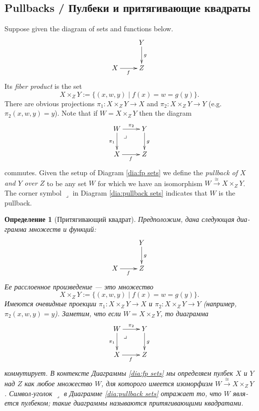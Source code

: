 \documentclass[a4paper]{book}
\makeatletter
\def\to{\rightarrow}
\def\taking{\colon}
\def\iso{\cong}
\def\|{{\;|\;}}
\def\ullimit{\ar@{}[rd]|(.3)*+{\lrcorner}}
\newcommand{\To}[1]{\xrightarrow{#1}}
\theoremstyle{myth}
\newtheorem{definitionENG}[envENG]{\begin{english}Definition\end{english}}
\newtheorem{definitionRUS}[envRUS]{Определение}
\makeatother
\begin{document}
\begin{russian}
\subsection{Pullbacks / Пулбеки и притягивающие квадраты}

\begin{definitionENG}[Pullback]\label{def:pullback}
Suppose given the diagram of sets and functions below.
\begin{align}\label{dia:fp sets}
\xymatrix{&Y\ar[d]^g\\
X\ar[r]_f&Z}
\end{align}
Its {\em fiber product} is the set 
$$X\times_ZY:=\{(x,w,y)\|f(x)=w=g(y)\}.$$ There are obvious projections $\pi_1\taking X\times_ZY\to X$ and $\pi_2\taking X\times_ZY\to Y$ (e.g. $\pi_2(x,w,y)=y$). Note that if $W=X\times_ZY$ then the diagram 
\begin{align}\label{dia:pullback sets}
\xymatrix{W\ullimit\ar[r]^-{\pi_2}\ar[d]_{\pi_1}&Y\ar[d]^g\\
X\ar[r]_f&Z}
\end{align}
commutes. Given the setup of Diagram \ref{dia:fp sets} we define the {\em pullback of $X$ and $Y$ over $Z$} to be any set $W$ for which we have an isomorphism $W\To{\iso}X\times_ZY$. The corner symbol $\lrcorner$ in Diagram \ref{dia:pullback sets} indicates that $W$ is the pullback.
\end{definitionENG}

\begin{definitionRUS}[Притягивающий квадрат]\label{def:pullback}
Предположим, дана следующая диаграмма множеств и функций:
\begin{align}\label{dia:fp sets}
\xymatrix{&Y\ar[d]^g\\
X\ar[r]_f&Z}
\end{align}
Ее {\em расслоенное произведение} — это множество 
$$X\times_ZY:=\{(x,w,y)\|f(x)=w=g(y)\}.$$ 
Имеются очевидные проекции $\pi_1\taking X\times_ZY\to X$ и $\pi_2\taking X\times_ZY\to Y$ (например, $\pi_2(x,w,y)=y$). Заметим, что если $W=X\times_ZY$, то диаграмма 
\begin{align}\label{dia:pullback sets}
\xymatrix{W\ullimit\ar[r]^-{\pi_2}\ar[d]_{\pi_1}&Y\ar[d]^g\\
X\ar[r]_f&Z}
\end{align}
коммутирует. В контексте Диаграммы \ref{dia:fp sets} мы определяем {\em пулбек $X$ и $Y$ над $Z$} как любое множество $W$, для которого имеется изоморфизм $W\To{\iso}X\times_ZY$. Символ-уголок $\lrcorner$ в Диаграмме \ref{dia:pullback sets} отражает то, что $W$ является пулбеком; такие диаграммы называются {\em притягивающими квадратами}.
\end{definitionRUS}


\end{russian}
\end{document}
